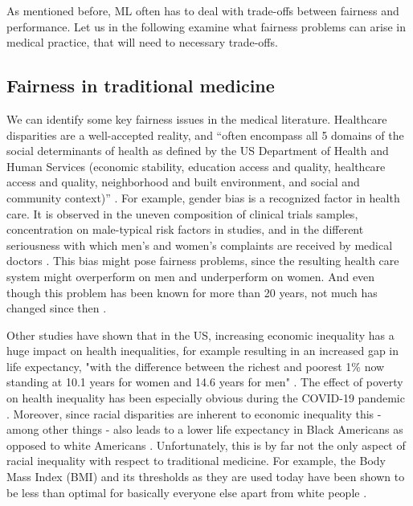     As mentioned before, ML often has to deal with trade-offs between fairness and performance.
    Let us in the following examine what fairness problems can arise in medical practice, that will need to necessary trade-offs.

\subsection{Fairness in traditional medicine}
    We can identify some key fairness issues in the medical literature.
    Healthcare disparities are a well-accepted reality, and ``often encompass all 5 domains of the social determinants of health as defined by the US Department of Health and Human Services (economic stability, education access and quality, healthcare access and quality, neighborhood and built environment, and social and community context)'' \cite[p.~2]{Chen2021}.
    For example, gender bias is a recognized factor in health care.
    It is observed \eg in the uneven composition of clinical trials samples, concentration on male-typical risk factors in studies, and in the different seriousness with which men's and women's complaints are received by medical doctors \cite{Ruiz1997}.
    This bias might pose fairness problems, since the resulting health care system might overperform on men and underperform on women. And even though this problem has been known for more than 20 years, not much has changed since then \cite{nowogrodzki2017inequality}.

    Other studies have shown that in the US, increasing economic inequality has a huge impact on health inequalities, for example resulting in an increased gap in life expectancy, "with the difference between the richest and poorest 1\% now standing at 10.1 years for women and 14.6 years for men" \cite[p.~1431]{dickman2017inequality}. The effect of poverty on health inequality has been especially obvious during the COVID-19 pandemic \cite{patel2020poverty}. Moreover, since racial disparities are inherent to economic inequality this - among other things - also leads to a lower life expectancy in Black Americans as opposed to white Americans \cite{hero2016racial}. Unfortunately, this is by far not the only aspect of racial inequality with respect to traditional medicine. For example, the Body Mass Index (BMI) and its thresholds as they are used today have been shown to be less than optimal for basically everyone else apart from white people \cite{fontaine2003years, moharram2020correlation, hood2019allometric}. 

